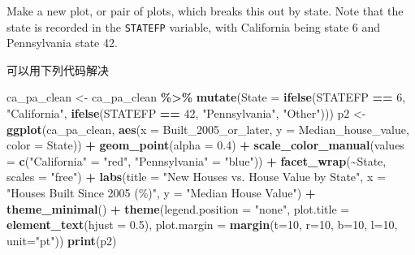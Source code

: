 \documentclass[
]{article}
\newenvironment{Shaded}{\begin{snugshade}}{\end{snugshade}}
\newcommand{\AttributeTok}[1]{\textcolor[rgb]{0.13,0.29,0.53}{#1}}
\newcommand{\DecValTok}[1]{\textcolor[rgb]{0.00,0.00,0.81}{#1}}
\newcommand{\FloatTok}[1]{\textcolor[rgb]{0.00,0.00,0.81}{#1}}
\newcommand{\FunctionTok}[1]{\textcolor[rgb]{0.13,0.29,0.53}{\textbf{#1}}}
\newcommand{\NormalTok}[1]{#1}
\newcommand{\OtherTok}[1]{\textcolor[rgb]{0.56,0.35,0.01}{#1}}
\newcommand{\SpecialCharTok}[1]{\textcolor[rgb]{0.81,0.36,0.00}{\textbf{#1}}}
\newcommand{\StringTok}[1]{\textcolor[rgb]{0.31,0.60,0.02}{#1}}
\begin{document}
Make a new plot, or pair of plots, which breaks this out by state. Note
that the state is recorded in the \texttt{STATEFP} variable, with
California being state 6 and Pennsylvania state 42.

可以用下列代码解决

\begin{Shaded}
\begin{Highlighting}[]
\NormalTok{ca\_pa\_clean }\OtherTok{\textless{}{-}}\NormalTok{ ca\_pa\_clean }\SpecialCharTok{\%\textgreater{}\%}
  \FunctionTok{mutate}\NormalTok{(}\AttributeTok{State =} \FunctionTok{ifelse}\NormalTok{(STATEFP }\SpecialCharTok{==} \DecValTok{6}\NormalTok{, }\StringTok{"California"}\NormalTok{,}
                        \FunctionTok{ifelse}\NormalTok{(STATEFP }\SpecialCharTok{==} \DecValTok{42}\NormalTok{, }\StringTok{"Pennsylvania"}\NormalTok{, }\StringTok{"Other"}\NormalTok{)))}
\NormalTok{p2 }\OtherTok{\textless{}{-}} \FunctionTok{ggplot}\NormalTok{(ca\_pa\_clean, }\FunctionTok{aes}\NormalTok{(}\AttributeTok{x =}\NormalTok{ Built\_2005\_or\_later, }
  \AttributeTok{y =}\NormalTok{ Median\_house\_value, }\AttributeTok{color =}\NormalTok{ State)) }\SpecialCharTok{+}
  \FunctionTok{geom\_point}\NormalTok{(}\AttributeTok{alpha =} \FloatTok{0.4}\NormalTok{) }\SpecialCharTok{+}
  \FunctionTok{scale\_color\_manual}\NormalTok{(}\AttributeTok{values =} \FunctionTok{c}\NormalTok{(}\StringTok{"California"} \OtherTok{=} \StringTok{"red"}\NormalTok{, }\StringTok{"Pennsylvania"} \OtherTok{=} \StringTok{"blue"}\NormalTok{)) }\SpecialCharTok{+}
  \FunctionTok{facet\_wrap}\NormalTok{(}\SpecialCharTok{\textasciitilde{}}\NormalTok{State, }\AttributeTok{scales =} \StringTok{"free"}\NormalTok{) }\SpecialCharTok{+}
  \FunctionTok{labs}\NormalTok{(}\AttributeTok{title =} \StringTok{"New Houses vs. House Value by State"}\NormalTok{,}
       \AttributeTok{x =} \StringTok{"Houses Built Since 2005 (\%)"}\NormalTok{, }
       \AttributeTok{y =} \StringTok{"Median House Value"}\NormalTok{) }\SpecialCharTok{+}
  \FunctionTok{theme\_minimal}\NormalTok{() }\SpecialCharTok{+}
  \FunctionTok{theme}\NormalTok{(}\AttributeTok{legend.position =} \StringTok{"none"}\NormalTok{,}
        \AttributeTok{plot.title =} \FunctionTok{element\_text}\NormalTok{(}\AttributeTok{hjust =} \FloatTok{0.5}\NormalTok{),}
        \AttributeTok{plot.margin =} \FunctionTok{margin}\NormalTok{(}\AttributeTok{t=}\DecValTok{10}\NormalTok{, }\AttributeTok{r=}\DecValTok{10}\NormalTok{, }\AttributeTok{b=}\DecValTok{10}\NormalTok{, }\AttributeTok{l=}\DecValTok{10}\NormalTok{, }\AttributeTok{unit=}\StringTok{"pt"}\NormalTok{))}
\FunctionTok{print}\NormalTok{(p2)}
\end{Highlighting}
\end{Shaded}
\end{document}
